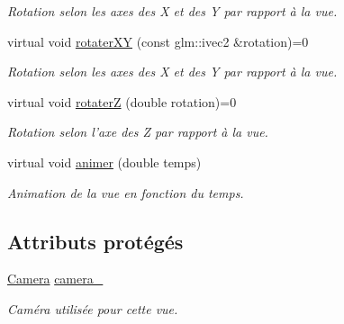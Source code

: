 \begin{DoxyCompactItemize}
\begin{DoxyCompactList}\small\item\em Rotation selon les axes des X et des Y par rapport à la vue. \end{DoxyCompactList}\item 
\hypertarget{classvue_1_1_vue_a39c80e5438dfe09f70baded5b1442b9a}{virtual void \hyperlink{classvue_1_1_vue_a39c80e5438dfe09f70baded5b1442b9a}{rotater\-X\-Y} (const glm\-::ivec2 \&rotation)=0}\label{classvue_1_1_vue_a39c80e5438dfe09f70baded5b1442b9a}

\begin{DoxyCompactList}\small\item\em Rotation selon les axes des X et des Y par rapport à la vue. \end{DoxyCompactList}\item 
\hypertarget{classvue_1_1_vue_a0b06a4b099a3bb953a672d84295556d9}{virtual void \hyperlink{classvue_1_1_vue_a0b06a4b099a3bb953a672d84295556d9}{rotater\-Z} (double rotation)=0}\label{classvue_1_1_vue_a0b06a4b099a3bb953a672d84295556d9}

\begin{DoxyCompactList}\small\item\em Rotation selon l'axe des Z par rapport à la vue. \end{DoxyCompactList}\item 
virtual void \hyperlink{classvue_1_1_vue_ab6435f4fa09e00dd2f96af3ff45dc60a}{animer} (double temps)
\begin{DoxyCompactList}\small\item\em Animation de la vue en fonction du temps. \end{DoxyCompactList}\end{DoxyCompactItemize}
\subsection*{Attributs protégés}
\begin{DoxyCompactItemize}
\item 
\hypertarget{classvue_1_1_vue_a9b2dabe1d684a33032343dfff03b929d}{\hyperlink{classvue_1_1_camera}{Camera} \hyperlink{classvue_1_1_vue_a9b2dabe1d684a33032343dfff03b929d}{camera\-\_\-}}\label{classvue_1_1_vue_a9b2dabe1d684a33032343dfff03b929d}

\begin{DoxyCompactList}\small\item\em Caméra utilisée pour cette vue. \end{DoxyCompactList}\end{DoxyCompactItemize}


